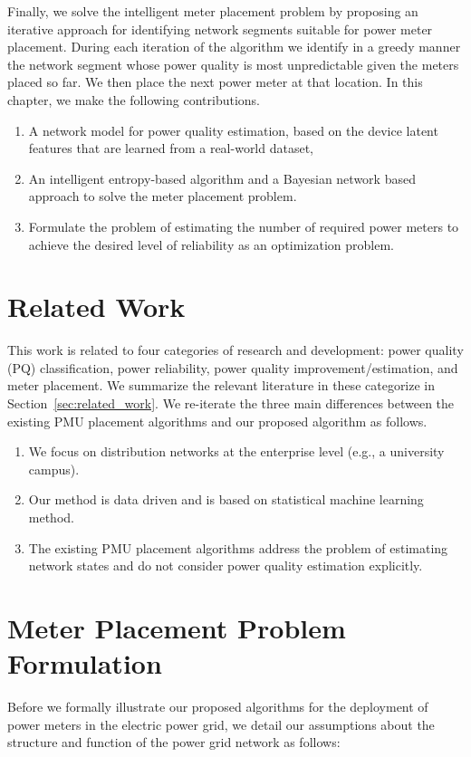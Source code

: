 Finally, we solve the intelligent meter placement problem by proposing an iterative approach for identifying network segments suitable for power meter placement. During each iteration of the algorithm we identify in a greedy manner the network segment whose power quality is most unpredictable given the meters placed so far. We then place the next power meter at that location. In this chapter, we make the following contributions. 
\begin{enumerate}
	\item A network model for power quality estimation, based on the device latent features that are learned from a real-world dataset, 
	\item An intelligent entropy-based algorithm and a Bayesian network based approach to solve the meter placement problem.
	\item Formulate the problem of estimating the number of required power meters to achieve the desired level of reliability as an optimization problem.
\end{enumerate}

\section{Related Work}
This work is related to four categories of research and development: power quality (PQ) classification, power reliability, power quality improvement/estimation, and meter placement. We summarize the relevant literature in these categorize in Section~\ref{sec:related_work}. We re-iterate the three main differences between the existing PMU placement algorithms and our proposed algorithm as follows.

\begin{enumerate}
\item We focus on distribution networks at the enterprise level (e.g., a university campus).
\item Our method is data driven and is based on statistical machine learning method.
\item The existing PMU placement algorithms address the problem of estimating network states and do not consider power quality estimation explicitly.
\end{enumerate}

\section{Meter Placement Problem Formulation}
Before we formally illustrate our proposed algorithms for the deployment of power meters in the electric power grid, we detail our assumptions about the structure and function of the power grid network as follows:

